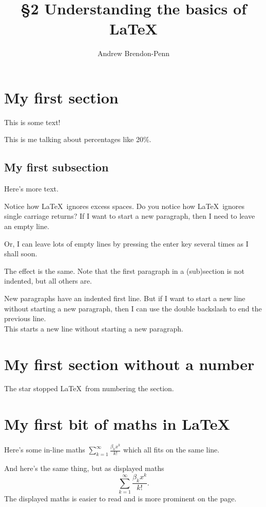 \documentclass[a4paper,11pt]{article}
\title{\S2 Understanding the basics of \LaTeX}
\author{Andrew Brendon-Penn}
\begin{document}

\maketitle  %


\section{My first section}

This is some text!


This is me talking about percentages like 20\%.

\subsection{My first subsection}
Here's more text.

Notice      how        \LaTeX \        ignores         excess         spaces.
Do
you
notice
how
\LaTeX \
ignores
single
carriage
returns?
If I want to start a new paragraph, then I need to leave an empty line.

Or, I can leave lots of empty lines by pressing the enter key several times as I shall soon.




The effect is the same. Note that the first paragraph in a (sub)section is not indented, but all others are.



New paragraphs have an indented first line. But if I want to start a new line  without starting   a new paragraph, then I can use  the double  backslash to end the previous line.\\ This starts a new line without starting a new paragraph.




\section*{My first section without a number}

The star stopped \LaTeX \ from numbering the section.

\section{My first bit of maths in \LaTeX}

Here's some in-line maths
$\sum_{k=1}^{\infty} \frac{\beta_k x^k}{k!}$
which all fits on the same line.

And here's the same thing, but as displayed maths
\[
\sum_{k=1}^{\infty} \frac{\beta_k x^k}{k!}.
\]
The displayed maths is easier to read and is more prominent on the page.
\end{document}
